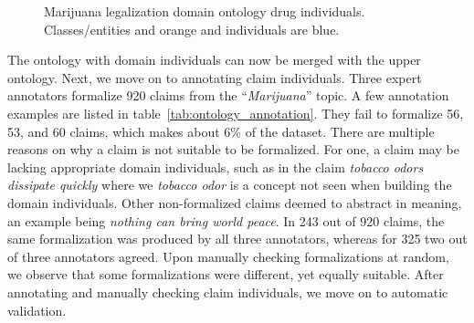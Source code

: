 \begin{figure}
\caption{Marijuana legalization domain ontology drug individuals. 
	Classes/entities and orange and individuals are blue. }
	\label{fig:drug_domain_individuals}
\end{figure}


The ontology with domain individuals can now be merged with the upper ontology. 
Next, we move on to annotating claim individuals. Three expert annotators
formalize 920 claims from the ``\emph{Marijuana}'' topic. A few annotation
examples are listed in table~\ref{tab:ontology_annotation}.
They fail to formalize 56, 53, and 60 claims, which makes about 6\% of the dataset. 
There are multiple reasons on why a claim is not suitable to be formalized. 
For one, a claim may be lacking appropriate domain individuals, such as in the claim
\emph{tobacco odors dissipate quickly} where we \emph{tobacco odor} is a concept
not seen when building the domain individuals. Other non-formalized claims
deemed to abstract in meaning, an example being \emph{nothing can bring 
world peace}. In 243 out of 920 claims, the same formalization was produced 
by all three annotators, whereas for 325 two out of three annotators agreed. 
Upon manually checking formalizations at random, we observe that some
formalizations were different, yet equally suitable. After annotating and manually
checking claim individuals, we move on to  automatic validation. 

